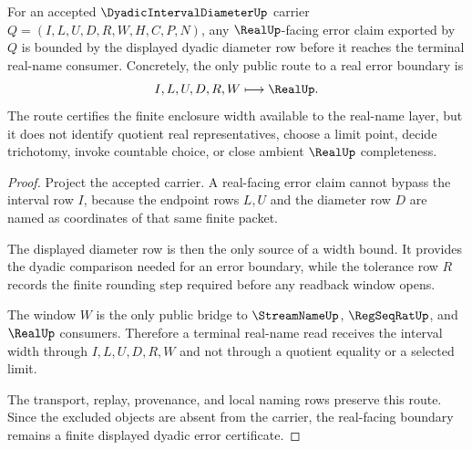 \begin{theorem}
\label{thm:dyadic-interval-diameter-real-error-boundary}
For an accepted $\DyadicIntervalDiameterUp$ carrier $Q=(I,L,U,D,R,W,H,C,P,N)$, any $\RealUp$-facing error claim exported by $Q$ is bounded by the displayed dyadic diameter row before it reaches the terminal real-name consumer. Concretely, the only public route to a real error boundary is
$$
I,L,U,D,R,W \longmapsto \RealUp .
$$
The route certifies the finite enclosure width available to the real-name layer, but it does not identify quotient real representatives, choose a limit point, decide trichotomy, invoke countable choice, or close ambient $\RealUp$ completeness.
\end{theorem}
\begin{proof}
Project the accepted carrier. A real-facing error claim cannot bypass the interval row $I$, because the endpoint rows $L,U$ and the diameter row $D$ are named as coordinates of that same finite packet.

The displayed diameter row is then the only source of a width bound. It provides the dyadic comparison needed for an error boundary, while the tolerance row $R$ records the finite rounding step required before any readback window opens.

The window $W$ is the only public bridge to $\StreamNameUp$, $\RegSeqRatUp$, and $\RealUp$ consumers. Therefore a terminal real-name read receives the interval width through $I,L,U,D,R,W$ and not through a quotient equality or a selected limit.

The transport, replay, provenance, and local naming rows preserve this route. Since the excluded objects are absent from the carrier, the real-facing boundary remains a finite displayed dyadic error certificate.
\end{proof}


